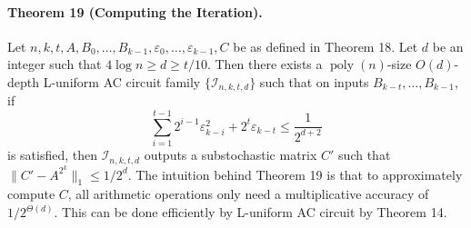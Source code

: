 \documentclass[10pt,a4paper]{article}
\begin{document}
\paragraph{Theorem 19 (Computing the Iteration).} Let $n,k,t,A,B_0,\ldots,B_{k-1},\varepsilon_0,\ldots,\varepsilon_{k-1},C$ be as defined in Theorem 18. Let $d$ be an integer such that $4\log n\ge d\ge t/10$. Then there exists a $\operatorname{poly}(n)$-size $O(d)$-depth L-uniform AC circuit family $\{\mathcal I_{n,k,t,d}\}$ such that on inputs $B_{k-t},\ldots,B_{k-1}$, if
\[\sum_{i=1}^{t-1}2^{i-1}\varepsilon_{k-i}^2+2^t\varepsilon_{k-t}\le\frac1{2^{d+2}}\]
is satisfied, then $\mathcal I_{n,k,t,d}$ outputs a substochastic matrix $C'$ such that $\|C'-A^{2^k}\|_1\le1/2^d$.
The intuition behind Theorem 19 is that to approximately compute $C$, all arithmetic operations only need a multiplicative accuracy of $1/2^{\Theta(d)}$. This can be done efficiently by L-uniform AC circuit by Theorem 14.
\end{document}
